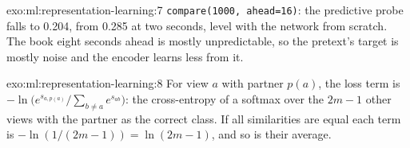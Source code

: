 \begin{solution}{exo:ml:representation-learning:7}
\texttt{compare(1000, ahead=16)}: the predictive probe falls to 0.204, from 0.285 at two seconds, level with the network
from scratch. The book eight seconds ahead is mostly unpredictable, so the pretext's target is mostly noise and the
encoder learns less from it.
\end{solution}

\begin{solution}{exo:ml:representation-learning:8}
For view $a$ with partner $p(a)$, the loss term is $-\ln\bigl(e^{s_{a,p(a)}}/\sum_{b\ne a}e^{s_{ab}}\bigr)$: the
cross-entropy of a softmax over the $2m - 1$ other views with the partner as the correct class. If all similarities are
equal each term is $-\ln(1/(2m-1)) = \ln(2m - 1)$, and so is their average.
\end{solution}

